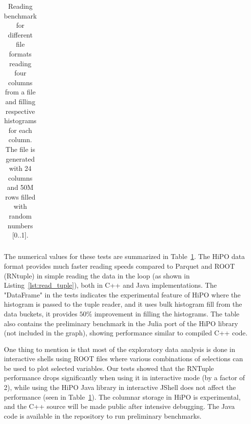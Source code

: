 \begin{table}[h!]
\begin{tabular}{|p{7cm}|p{3.0cm}|p{4.0cm}|}
\end{tabular}
\caption{Reading benchmark for different file formats reading four columns from a file and filling respective histograms for each column. The file is generated with 24 columns and 50M rows filled with random numbers [0..1]. }
\label{tab:read_benchmark}
\end{table}

The numerical values for these tests are summarized in Table~\ref{tab:read_benchmark}. 
The HiPO data format provides much faster reading speeds compared to Parquet and ROOT (RNtuple) in simple reading the data in the loop (as shown in Listing~\ref{lst:read_tuple}), both in C++ and Java implementations. The "DataFrame" in the tests indicates the experimental feature of HiPO where the histogram is passed to the tuple reader, and it uses bulk histogram fill from the data buckets, it provides $50\%$ improvement in filling the histograms.
The table also contains the preliminary benchmark in the Julia port of the HiPO library (not included in the graph), showing performance similar to compiled C++ code.

One thing to mention is that most of the exploratory data analysis is done in interactive shells using ROOT files where various combinations of selections can be used to plot selected variables. Our tests showed that the RNTuple performance drops significantly when using it in interactive mode (by a factor of 2), while using the HiPO Java library in interactive JShell does not affect the performance (seen in Table~\ref{tab:read_benchmark}). 
The columnar storage in HiPO is experimental, and the C++ source will be made public after intensive debugging. The Java code is available in the repository to run preliminary benchmarks.


